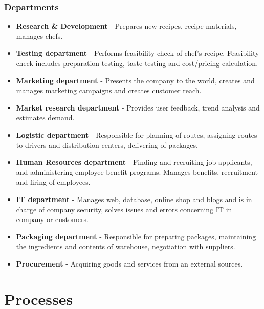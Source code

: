 \documentclass[11pt,a4paper]{article}
\begin{document}
\subsubsection{Departments}

\begin{itemize}
    \item \textbf{Research \& Development} - Prepares new recipes, recipe materials, manages chefs.
    \item \textbf{Testing department} - Performs feasibility check of chef’s recipe. Feasibility check includes preparation testing, taste testing and cost/pricing calculation.
    \item \textbf{Marketing department} - Presents the company to the world, creates and manages marketing campaigns and creates customer reach.
    \item \textbf{Market research department} - Provides user feedback, trend analysis and estimates demand.
    \item \textbf{Logistic department} - Responsible for planning of routes, assigning routes to drivers and distribution centers, delivering of packages.
    \item \textbf{Human Resources department} - Finding and recruiting job applicants, and administering employee-benefit programs. Manages benefits, recruitment and firing of employees.
    \item \textbf{IT department} - Manages web, database, online shop and blogs and is in charge of company security, solves issues and errors concerning IT in company or customers.
    \item \textbf{Packaging department} - Responsible for preparing packages, maintaining the ingredients and contents of warehouse, negotiation with suppliers.
    \item \textbf{Procurement} - Acquiring goods and services from an external sources.
\end{itemize}


\section{Processes}
\end{document}
